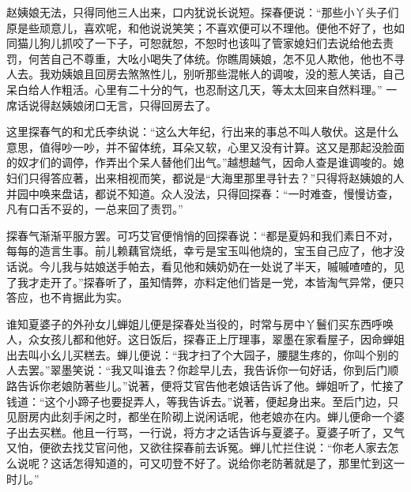 \begin{parag}
    赵姨娘无法，只得同他三人出来，口内犹说长说短。探春便说：“那些小丫头子们原是些顽意儿，喜欢呢，和他说说笑笑；不喜欢便可以不理他。便他不好了，也如同猫儿狗儿抓咬了一下子，可恕就恕，不恕时也该叫了管家媳妇们去说给他去责罚，何苦自己不尊重，大吆小喝失了体统。你瞧周姨娘，怎不见人欺他，他也不寻人去。我劝姨娘且回房去煞煞性儿，别听那些混帐人的调唆，没的惹人笑话，自己呆白给人作粗活。心里有二十分的气，也忍耐这几天，等太太回来自然料理。” 一席话说得赵姨娘闭口无言，只得回房去了。
\end{parag}


\begin{parag}
    这里探春气的和尤氏李纨说：“这么大年纪，行出来的事总不叫人敬伏。这是什么意思，值得吵一吵，并不留体统，耳朵又软，心里又没有计算。这又是那起没脸面的奴才们的调停，作弄出个呆人替他们出气。”越想越气，因命人查是谁调唆的。媳妇们只得答应著，出来相视而笑，都说是“大海里那里寻针去？”只得将赵姨娘的人并园中唤来盘诘，都说不知道。众人没法，只得回探春：“一时难查，慢慢访查，凡有口舌不妥的，一总来回了责罚。”
\end{parag}


\begin{parag}
    探春气渐渐平服方罢。可巧艾官便悄悄的回探春说：“都是夏妈和我们素日不对，每每的造言生事。前儿赖藕官烧纸，幸亏是宝玉叫他烧的，宝玉自己应了，他才没话说。今儿我与姑娘送手帕去，看见他和姨奶奶在一处说了半天，嘁嘁喳喳的，见了我才走开了。”探春听了，虽知情弊，亦料定他们皆是一党，本皆淘气异常，便只答应，也不肯据此为实。
\end{parag}


\begin{parag}
    谁知夏婆子的外孙女儿蝉姐儿便是探春处当役的，时常与房中丫鬟们买东西呼唤人，众女孩儿都和他好。这日饭后，探春正上厅理事，翠墨在家看屋子，因命蝉姐出去叫小幺儿买糕去。蝉儿便说：“我才扫了个大园子，腰腿生疼的，你叫个别的人去罢。”翠墨笑说：“我又叫谁去？你趁早儿去，我告诉你一句好话，你到后门顺路告诉你老娘防著些儿。”说著，便将艾官告他老娘话告诉了他。蝉姐听了，忙接了钱道：“这个小蹄子也要捉弄人，等我告诉去。”说著，便起身出来。至后门边，只见厨房内此刻手闲之时，都坐在阶砌上说闲话呢，他老娘亦在内。蝉儿便命一个婆子出去买糕。他且一行骂，一行说，将方才之话告诉与夏婆子。夏婆子听了，又气又怕，便欲去找艾官问他，又欲往探春前去诉冤。蝉儿忙拦住说：“你老人家去怎么说呢？这话怎得知道的，可又叨登不好了。说给你老防著就是了，那里忙到这一时儿。”
\end{parag}


